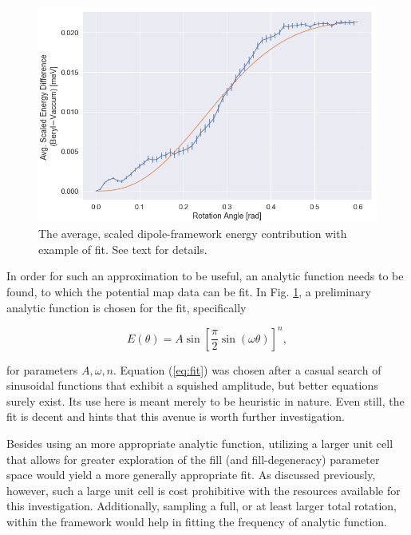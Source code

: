         \begin{figure}
            \centering
            \includegraphics[width=0.9\linewidth]{Figures/System/diff_analysis_fit.png}
            \caption{The average, scaled dipole-framework energy contribution with example of fit. See text for details.}
            \label{fig:framework_contribution_fit}
        \end{figure}
        
        In order for such an approximation to be useful, an analytic function needs to be found, to which the potential map data can be fit. In Fig. \ref{fig:framework_contribution_fit}, a preliminary analytic function is chosen for the fit, specifically
        
        \begin{equation}
        \label{eq:fit}
            E(\theta) = A\sin\left[\frac{\pi}{2} \sin\left( \omega \theta \right)\right]^n,
        \end{equation}

        \noindent for parameters $A,\omega,n$. Equation (\ref{eq:fit}) was chosen after a casual search of sinusoidal functions that exhibit a squished amplitude, but better equations surely exist. Its use here is meant merely to be heuristic in nature. Even still, the fit is decent and hints that this avenue is worth further investigation. 
        
        Besides using an more appropriate analytic function, utilizing a larger unit cell that allows for greater exploration of the fill (and fill-degeneracy) parameter space would yield a more generally appropriate fit. As discussed previously, however, such a large unit cell is cost prohibitive with the resources available for this investigation. Additionally, sampling a full, or at least larger total rotation, within the framework would help in fitting the frequency of analytic function.
        
